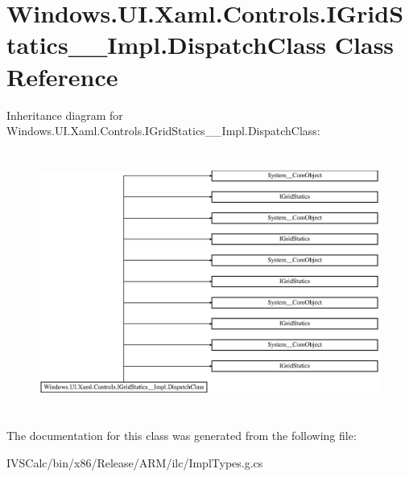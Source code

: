 \hypertarget{class_windows_1_1_u_i_1_1_xaml_1_1_controls_1_1_i_grid_statics_____impl_1_1_dispatch_class}{}\section{Windows.\+U\+I.\+Xaml.\+Controls.\+I\+Grid\+Statics\+\_\+\+\_\+\+Impl.\+Dispatch\+Class Class Reference}
\label{class_windows_1_1_u_i_1_1_xaml_1_1_controls_1_1_i_grid_statics_____impl_1_1_dispatch_class}
Inheritance diagram for Windows.\+U\+I.\+Xaml.\+Controls.\+I\+Grid\+Statics\+\_\+\+\_\+\+Impl.\+Dispatch\+Class\+:\begin{figure}[H]
\begin{center}
\leavevmode
\includegraphics[height=8.651686cm]{class_windows_1_1_u_i_1_1_xaml_1_1_controls_1_1_i_grid_statics_____impl_1_1_dispatch_class}
\end{center}
\end{figure}


The documentation for this class was generated from the following file\+:\begin{DoxyCompactItemize}
\item 
I\+V\+S\+Calc/bin/x86/\+Release/\+A\+R\+M/ilc/Impl\+Types.\+g.\+cs\end{DoxyCompactItemize}
